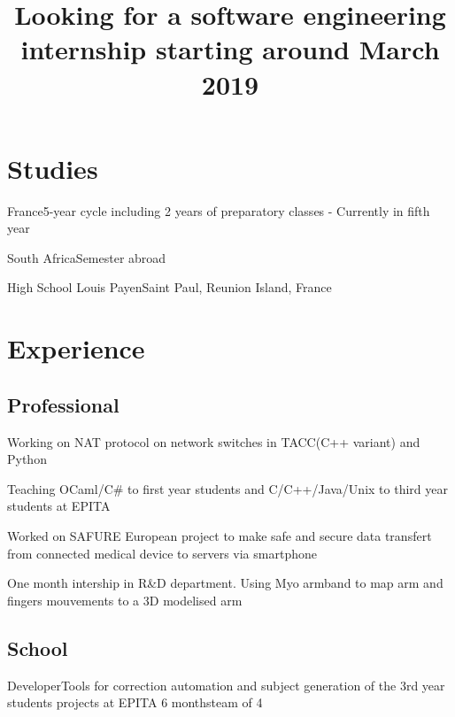 \documentclass[10pt,a4paper]{moderncv}
\title{Looking for a software engineering internship starting around March 2019}
\begin{document}
\makecvtitle

\section{Studies}

{France}{5-year cycle including 2 years of preparatory classes - Currently in
fifth year}

{South Africa}{Semester abroad}

{High School Louis Payen}{Saint Paul, Reunion Island, France}{}{}

\section{Experience}

\subsection{Professional}

{Working on NAT protocol on network switches in TACC(C++ variant) and Python}{}

{Teaching OCaml/C\# to first year students and C/C++/Java/Unix to third year students at EPITA}{}

{Worked on SAFURE European project to make safe and secure data transfert from connected medical device to servers via smartphone}{}

{One month intership in R\&D department. Using Myo armband to map arm and fingers mouvements to a 3D modelised arm}{}

\subsection{School}

{Developer}{Tools for correction automation and subject generation of the 3rd year students projects at EPITA}
{6 months}{team of 4}{}
\end{document}
